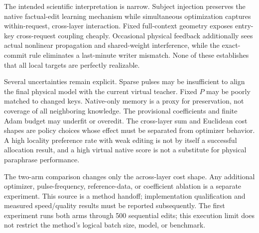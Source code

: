 \documentclass[10pt]{article}
\begin{document}
The intended scientific interpretation is narrow. Subject injection
preserves the native factual-edit learning mechanism while simultaneous
optimization captures within-request, cross-layer interaction. Fixed
full-context geometry exposes entry-key cross-request coupling cheaply.
Occasional physical feedback additionally sees actual nonlinear
propagation and shared-weight interference, while the exact-commit rule
eliminates a last-minute writer mismatch. None of these establishes that
all local targets are perfectly realizable.

Several uncertainties remain explicit. Sparse pulses may be insufficient
to align the final physical model with the current virtual teacher.
Fixed $P$ may be poorly matched to changed keys. Native-only memory is a
proxy for preservation, not coverage of all neighboring knowledge.
The provisional coefficients and finite Adam budget may underfit or
overedit. The cross-layer sum and Euclidean cost shapes are policy
choices whose effect must be separated from optimizer behavior. A high
locality preference rate with weak editing is not by itself a successful
allocation result, and a high virtual native score is not a substitute
for physical paraphrase performance.

The two-arm comparison changes only the across-layer cost shape. Any
additional optimizer, pulse-frequency, reference-data, or coefficient
ablation is a separate experiment. This source is a method handoff;
implementation qualification and measured speed/quality results must be
reported subsequently. The first experiment runs both arms through 500
sequential edits; this execution limit does not restrict the method's
logical batch size, model, or benchmark.
\end{document}
